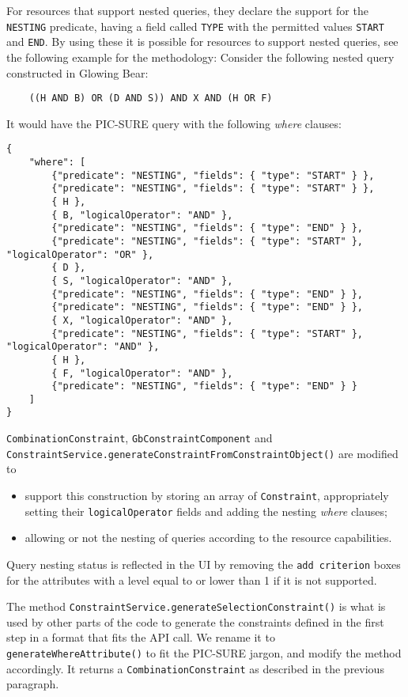 For resources that support nested queries, they declare the support for the \verb|NESTING| predicate, having a field called \verb|TYPE| with the permitted values \verb|START| and \verb|END|.
By using these it is possible for resources to support nested queries, see the following example for the methodology:
Consider the following nested query constructed in Glowing Bear:
\begin{verbatim}
    ((H AND B) OR (D AND S)) AND X AND (H OR F)
\end{verbatim}
It would have the PIC-SURE query with the following \emph{where} clauses:
\begin{verbatim}
{
    "where": [
        {"predicate": "NESTING", "fields": { "type": "START" } },
        {"predicate": "NESTING", "fields": { "type": "START" } },
        { H },
        { B, "logicalOperator": "AND" },
        {"predicate": "NESTING", "fields": { "type": "END" } },
        {"predicate": "NESTING", "fields": { "type": "START" }, "logicalOperator": "OR" },
        { D },
        { S, "logicalOperator": "AND" },
        {"predicate": "NESTING", "fields": { "type": "END" } },
        {"predicate": "NESTING", "fields": { "type": "END" } },
        { X, "logicalOperator": "AND" },
        {"predicate": "NESTING", "fields": { "type": "START" }, "logicalOperator": "AND" },
        { H },
        { F, "logicalOperator": "AND" },
        {"predicate": "NESTING", "fields": { "type": "END" } }
    ]
}
\end{verbatim}

\verb|CombinationConstraint|, \verb|GbConstraintComponent| and \verb|ConstraintService.generateConstraintFromConstraintObject()| are modified to 
\begin{itemize}
    \item support this construction by storing an array of \verb|Constraint|, appropriately setting their \verb|logicalOperator| fields and adding the nesting \emph{where} clauses;
    \item allowing or not the nesting of queries according to the resource capabilities.
\end{itemize}
Query nesting status is reflected in the UI by removing the \verb|add criterion| boxes for the attributes with a level equal to or lower than 1 if it is not supported.

The method \verb|ConstraintService.generateSelectionConstraint()| is what is used by other parts of the code to generate the constraints defined in the first step in a format that fits the API call.
We rename it to \verb|generateWhereAttribute()| to fit the PIC-SURE jargon, and modify the method accordingly.
It returns a \verb|CombinationConstraint| as described in the previous paragraph.

